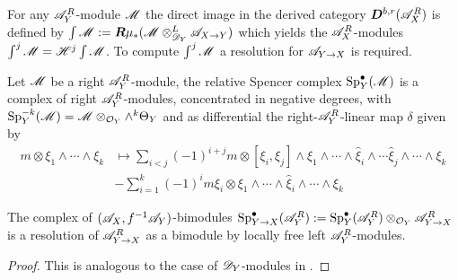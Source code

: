     For any $\mathscr{A}_Y^R$-module $\mathscr{M}$ the direct image in the derived category $\boldsymbol{D}^{b,r}(\mathscr{A}_X^R)$ is defined by $\int \mathscr{M} := \boldsymbol{R}\mu_* (\mathscr{M} \otimes_{\mathscr{D}_Y}^L \mathscr{A}_{X\to Y})$ which yields the $\mathscr{A}_X^R$-modules $\int^j \mathscr{M} = \mathscr{H}^j \int \mathscr{M}$.
    To compute $\int^j \mathscr{M}$ a resolution for $\mathscr{A}_{Y\to X}$ is required. 
    \begin{definition}
        Let $\mathscr{M}$ be a right $\mathscr{A}_Y^R$-module, the relative Spencer complex $\operatorname{Sp}_Y^\bullet(\mathscr{M})$ is a complex of right $\mathscr{A}_Y^R$-modules, concentrated in negative degrees, with $\operatorname{Sp}_Y^{-k}(\mathscr{M}) = \mathscr{M} \otimes_{\mathcal{O}_Y} \wedge^{k}\Theta_Y$ and as differential the right-$\mathscr{A}_Y^R$-linear map $\delta$ given by
        \begin{align*}
            m\otimes \xi_1 \wedge \cdots \wedge \xi_k &\mapsto \sum_{i<j}(-1)^{i+j} m \otimes [\xi_i,\xi_j]\wedge \xi_1 \wedge \cdots \wedge \widehat{\xi}_i \wedge\cdots \widehat{\xi}_j \wedge \cdots \wedge \xi_k\\
            &- \sum_{i=1}^k (-1)^{i} m\xi_i \otimes \xi_1 \wedge \cdots \wedge \widehat{\xi}_i\wedge \cdots \wedge \xi_k 
        \end{align*}
        \begin{lemma}
            The complex of $(\mathscr{A}_X,f^{-1}\mathscr{A}_Y)$-bimodules $\operatorname{Sp}^\bullet_{Y\to X}(\mathscr{A}_Y^R) := \operatorname{Sp}^\bullet_Y(\mathscr{A}_Y^R) \otimes_{\mathcal{O}_Y}\mathscr{A}_{Y \to X}^R$ is a resolution of $\mathscr{A}_{Y\to X}^R$ as a bimodule by locally free left $\mathscr{A}_Y^R$-modules.
        \end{lemma}
        \begin{proof}
            This is analogous to the case of $\mathscr{D}_Y$-modules in \cite[p33]{sabbah2011introduction}.
        \end{proof}
    \end{definition}
